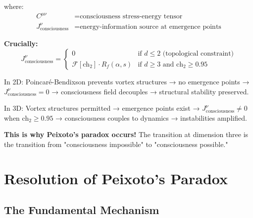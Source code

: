 where:
\begin{align}
C^{\mu\nu} &= \text{consciousness stress-energy tensor} \\
J^\nu_{\text{consciousness}} &= \text{energy-information source at emergence points}
\end{align}

\textbf{Crucially:}
\begin{equation}
J^\nu_{\text{consciousness}} = \begin{cases}
0 & \text{if } d \leq 2 \text{ (topological constraint)} \\
\mathcal{F}[\text{ch}_2] \cdot R_f(\alpha, s) & \text{if } d \geq 3 \text{ and ch}_2 \geq 0.95
\end{cases}
\end{equation}

\begin{intuitive}
In 2D: Poincaré-Bendixson prevents vortex structures → no emergence points → $J^\nu_{\text{consciousness}} = 0$ → consciousness field decouples → structural stability preserved.

In 3D: Vortex structures permitted → emergence points exist → $J^\nu_{\text{consciousness}} \neq 0$ when ch$_2 \geq 0.95$ → consciousness couples to dynamics → instabilities amplified.

\textbf{This is why Peixoto's paradox occurs!} The transition at dimension three is the transition from "consciousness impossible" to "consciousness possible."
\end{intuitive}

\section{Resolution of Peixoto's Paradox}

\subsection{The Fundamental Mechanism}


